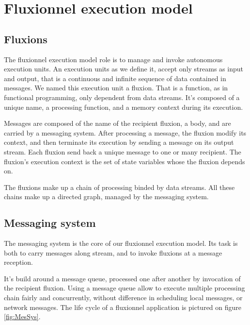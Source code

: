 \section{Fluxionnel execution model}

\subsection{Fluxions}

The fluxionnel execution model role is to manage and invoke autonomous execution units.
An execution units as we define it, accept only streams as input and output, that is a continuous and infinite sequence of data contained in messages.
We named this execution unit a fluxion.
That is a function, as in functional programming, only dependent from data streams.
It's composed of a unique name, a processing function, and a memory context during its execution.

Messages are composed of the name of the recipient fluxion, a body, and are carried by a messaging system.
After processing a message, the fluxion modify its context, and then terminate its execution by sending a message on its output stream.
Each fluxion send back a unique message to one or many recipient.
The fluxion's execution context is the set of state variables whose the fluxion depends on.

The fluxions make up a chain of processing binded by data streams.
All these chains make up a directed graph, managed by the messaging system.

\subsection{Messaging system}

The messaging system is the core of our fluxionnel execution model.
Its task is both to carry messages along stream, and to invoke fluxions at a message reception.

It's build around a message queue, processed one after another by invocation of the recipient fluxion.
Using a message queue allow to execute multiple processing chain fairly and concurrently, without difference in scheduling local messages, or network messages.
The life cycle of a fluxionnel application is pictured on figure \ref{fig:MesSys}.

